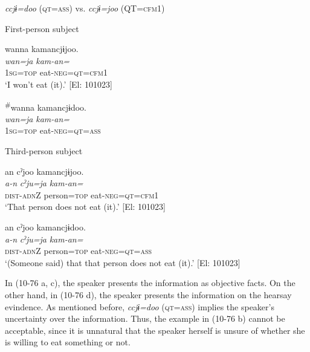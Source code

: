 \ea\label{ex:10.76}   \textit{ccjɨ=doo} (\textsc{qt}=\textsc{ass}) vs. \textit{ccjɨ=joo} (QT=\textsc{cfm}1)\\
  \begin{xlist}
  \exi{} First-person subject

  \ex  %
      \glll    wanna  kamancjɨjoo.  \\
      \textit{wan=ja}  \textit{kam-an=}  \\
      1\textsc{sg}=\textsc{top}  eat-\textsc{neg}=\textsc{qt}=\textsc{cfm}1  \\
      \glt       ‘I won’t eat (it).’ [El: 101023]

  \ex  %
      \glll    \textsuperscript{\#}wanna  kamancjɨdoo.\\
      \textit{wan=ja}  \textit{kam-an=}\\
      1\textsc{sg}=\textsc{top}  eat-\textsc{neg}=\textsc{qt}=\textsc{ass}\\
      \glt [El: 101023]

  \exi{} Third-person subject

  \ex  %
      \glll     an  cˀjoo  kamancjɨjoo.\\
      \textit{a-n}  \textit{cˀju=ja}  \textit{kam-an=}\\
      \textsc{dist}-\textsc{adn}Z  person=\textsc{top}  eat-\textsc{neg}=\textsc{qt}=\textsc{cfm}1\\
      \glt        ‘That person does not eat (it).’ [El: 101023]

  \ex  %
      \glll     an  cˀjoo  kamancjɨdoo.\\
      \textit{a-n}  \textit{cˀju=ja}  \textit{kam-an=}\\
      \textsc{dist}-\textsc{adn}Z  person=\textsc{top}  eat-\textsc{neg}=\textsc{qt}=\textsc{ass}\\
      \glt        ‘(Someone said) that that person does not eat (it).’ [El: 101023]
    \end{xlist}
\z

In (10-76 a, c), the speaker presents the information as objective facts. On the other hand, in (10-76 d), the speaker presents the information on the hearsay evindence. As mentioned before, \textit{ccjɨ=doo} (\textsc{qt}=\textsc{ass}) implies the speaker’s uncertainty over the information. Thus, the example in (10-76 b) cannot be acceptable, since it is unnatural that the speaker herself is unsure of whether she is willing to eat something or not.

